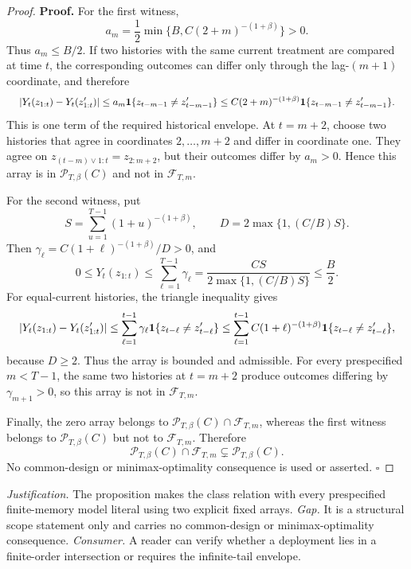 \documentclass{article}
\begin{document}
\begin{proof}
\textbf{Proof.} For the first witness,
\[
a_m=\frac12\min\{B,C(2+m)^{-(1+\beta)}\}>0.
\]
Thus \(a_m\le B/2\). If two histories with the same current treatment are compared at time \(t\), the corresponding outcomes can differ only through the lag-\((m+1)\) coordinate, and therefore
\[
\makebox[\linewidth][c]{\resizebox{0.98\linewidth}{!}{\(\displaystyle \left|Y_t(z_{1:t})-Y_t(z'_{1:t})\right|
\le a_m\mathbf 1\{z_{t-m-1}\ne z'_{t-m-1}\}
\le C(2+m)^{-(1+\beta)}
\mathbf 1\{z_{t-m-1}\ne z'_{t-m-1}\}.\)}}
\]
This is one term of the required historical envelope. At \(t=m+2\), choose two histories that agree in coordinates \(2,\ldots,m+2\) and differ in coordinate one. They agree on \(z_{(t-m)\vee1:t}=z_{2:m+2}\), but their outcomes differ by \(a_m>0\). Hence this array is in \(\mathcal P_{T,\beta}(C)\) and not in \(\mathcal F_{T,m}\).

For the second witness, put
\[
S=\sum_{u=1}^{T-1}(1+u)^{-(1+\beta)},
\qquad
D=2\max\{1,(C/B)S\}.
\]
Then \(\gamma_\ell=C(1+\ell)^{-(1+\beta)}/D>0\), and
\[
0\le Y_t(z_{1:t})
\le\sum_{\ell=1}^{T-1}\gamma_\ell
=\frac{CS}{2\max\{1,(C/B)S\}}
\le\frac B2.
\]
For equal-current histories, the triangle inequality gives
\[
\makebox[\linewidth][c]{\resizebox{0.98\linewidth}{!}{\(\displaystyle \left|Y_t(z_{1:t})-Y_t(z'_{1:t})\right|
\le\sum_{\ell=1}^{t-1}\gamma_\ell
\mathbf1\{z_{t-\ell}\ne z'_{t-\ell}\}
\le\sum_{\ell=1}^{t-1}C(1+\ell)^{-(1+\beta)}
\mathbf1\{z_{t-\ell}\ne z'_{t-\ell}\},\)}}
\]
because \(D\ge2\). Thus the array is bounded and admissible. For every prespecified \(m<T-1\), the same two histories at \(t=m+2\) produce outcomes differing by \(\gamma_{m+1}>0\), so this array is not in \(\mathcal F_{T,m}\).

Finally, the zero array belongs to \(\mathcal P_{T,\beta}(C)\cap\mathcal F_{T,m}\), whereas the first witness belongs to \(\mathcal P_{T,\beta}(C)\) but not to \(\mathcal F_{T,m}\). Therefore
\[
\mathcal P_{T,\beta}(C)\cap\mathcal F_{T,m}
\subsetneq\mathcal P_{T,\beta}(C).
\]
No common-design or minimax-optimality consequence is used or asserted. \(\square\)
\end{proof}
\par\smallskip\noindent \textit{Justification.} The proposition makes the class relation with every prespecified finite-memory model literal using two explicit fixed arrays. \textit{Gap.} It is a structural scope statement only and carries no common-design or minimax-optimality consequence. \textit{Consumer.} A reader can verify whether a deployment lies in a finite-order intersection or requires the infinite-tail envelope.
\end{document}
